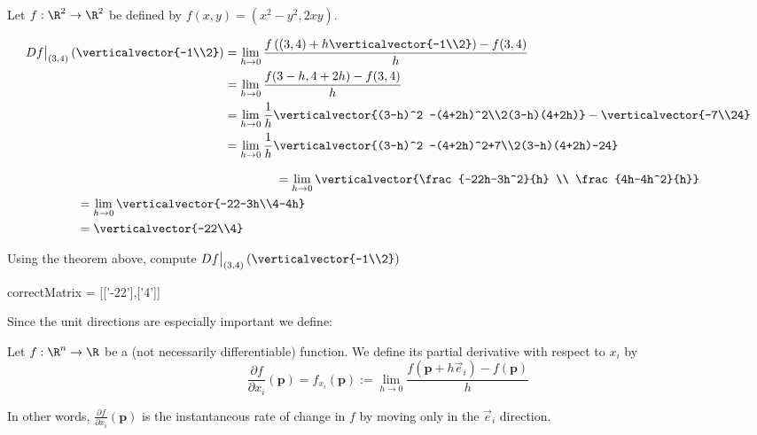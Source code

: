 \documentclass{ximera}
\begin{document}
	\begin{question}
		Let $f:\R^2 \to \R^2$ be defined by $f(x,y)=(x^2-y^2,2xy)$.
			\begin{solution}
				\begin{hint}
					\begin{align*}
						  Df\big|_{(3,4)}\left(\verticalvector{-1\\2}\right) &= \lim_{h \to 0} \frac{f\left((3,4)+h\verticalvector{-1\\2}\right) - f(3,4)}{h}\\
						  &= \lim_{h \to 0} \frac{f(3-h,4+2h)-f(3,4)}{h}\\
						  &= \lim_{h \to 0}\frac{1}{h}  \verticalvector{(3-h)^2 -(4+2h)^2\\2(3-h)(4+2h)} - \verticalvector{-7\\24} \\
						  &=\lim_{h \to 0}\frac{1}{h} \verticalvector{(3-h)^2 -(4+2h)^2+7\\2(3-h)(4+2h)-24}
					\end{align*}
				\end{hint}
				\begin{hint}
					\begin{align*}
						& \hphantom{Df\big|_{(3,4)}\left(\verticalvector{-1\\2}\right) }=\lim_{h \to 0}\verticalvector{\frac{-22h-3h^2}{h} \\ \frac{4h-4h^2}{h}}\\
						&=\lim_{h \to 0}\verticalvector{-22-3h\\4-4h}\\
						&=\verticalvector{-22\\4}
					\end{align*}
				\end{hint}
				Using the theorem above, compute $Df\big|_{(3,4)}\left(\verticalvector{-1\\2}\right)$
				\begin{matrix-answer}
					correctMatrix = [['-22'],['4']]
				\end{matrix-answer}
			\end{solution}
	\end{question}

	Since the unit directions are especially important we define:
	
	\begin{definition}
		Let $f: \R^n \to \R$ be a (not necessarily differentiable) function.  We define its partial derivative with respect to $x_i$ by
		\[
			\frac{\partial f}{\partial x_i} (\mathbf{p}) = f_{x_i}(\mathbf{p}) := \lim_{h \to 0} \frac{f(\mathbf{p}+h\vec{e}_i)-f(\mathbf{p})}{h}
		\]
		
		In other words, $\frac{\partial f}{\partial x_i} (\mathbf{p})$ is the instantaneous rate of change in $f$ by moving only in the $\vec{e}_i$ direction.
	\end{definition}	
	
\end{document}
